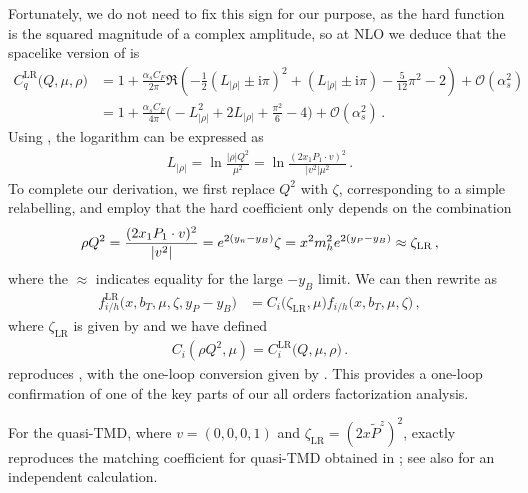 \documentclass[11pt,a4paper]{article}
\newcommand{\img}{\mathrm{i}}
\newcommand{\cO}{\mathcal{O}}
\newcommand{\nn}{\nonumber}
\newcommand{\as}{\alpha_s}
\newcommand{\LR}{\mathrm{LR}}
\begin{document}
Fortunately, we do not need to fix this sign for our purpose,
as the hard function is the squared magnitude of a complex amplitude,
so at NLO we deduce that the spacelike version of  is
\begin{align} \label{eq:C_LR_2}
 C_q^\LR\bigl(Q, \mu, \rho\bigr) &
 = 1 + \frac{\as C_F}{2\pi} \Re \left( -  \frac12 (L_{|\rho|} \pm \img\pi)^2 + (L_{|\rho|} \pm \img\pi) - \frac{5}{12} \pi^2 - 2 \right) + \cO(\as^2)
 \nn\\&
 = 1 + \frac{\as C_F}{4\pi} \biggl( -  L_{|\rho|}^2 + 2 L_{|\rho|} + \frac{\pi^2}{6} - 4 \biggr) + \cO(\as^2)
\,.\end{align}
Using , the logarithm can be expressed as
\begin{align}
 L_{|\rho|}
 = \ln\frac{|\rho| Q^2}{\mu^2}
 = \ln\frac{(2 x_1 P_1 \cdot v)^2}{|v^2| \mu^2}
\,.\end{align}
To complete our derivation, we first replace $Q^2$ with $\zeta$,
corresponding to a simple relabelling, and employ that the hard coefficient
only depends on the combination
\begin{align}
\rho Q^2 = \frac{(2 x_1 P_1 \cdot v)^2}{|v^2|}
 = e^{2 (y_n - y_B)}\zeta =x^2 m_h^2 e^{2(y_P - y_B)} \approx \zeta_{\rm LR}
\,,\end{align}
where the $\approx$ indicates equality for the large $-y_B$ limit. 
We can then rewrite  as
\begin{align} \label{eq:tmd_scheme_relations_5}
 f^\LR_{i/h}\bigl(x, b_T, \mu, \zeta, y_P - y_B \bigr) &
 = C_i(\zeta_\LR, \mu \bigr)
   f_{i/h}\bigl(x, b_T, \mu, \zeta \bigr)
\,,\end{align}
where $\zeta_\LR$ is given by  and 
we have defined
\begin{align}
 C_i(\rho Q^2, \mu) = C_i^\LR\bigl(Q, \mu, \rho\bigr)
\,.\end{align}
 reproduces , with the one-loop
conversion given by . 
This provides a one-loop confirmation of one of the key parts of our all orders factorization analysis.

For the quasi-TMD, where $v = (0,0,0,1)$ and $\zeta_\LR = (2 x \tilde P^z)^2$,
 exactly reproduces the matching coefficient for quasi-TMD obtained in ;
see also  for an independent calculation.



\FloatBarrier
\end{document}

